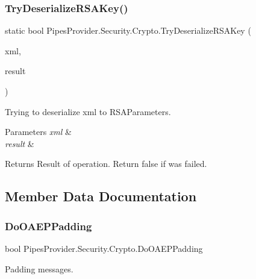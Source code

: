 \subsubsection{\texorpdfstring{Try\+Deserialize\+R\+S\+A\+Key()}{TryDeserializeRSAKey()}}
{\footnotesize\ttfamily static bool Pipes\+Provider.\+Security.\+Crypto.\+Try\+Deserialize\+R\+S\+A\+Key (\begin{DoxyParamCaption}\item[{string}]{xml,  }\item[{out R\+S\+A\+Parameters}]{result }\end{DoxyParamCaption})\hspace{0.3cm}{\ttfamily [static]}}



Trying to deserialize xml to R\+S\+A\+Parameters. 


\begin{DoxyParams}{Parameters}
{\em xml} & \\
\hline
{\em result} & \\
\hline
\end{DoxyParams}
\begin{DoxyReturn}{Returns}
Result of operation. Return false if was failed.
\end{DoxyReturn}


\subsection{Member Data Documentation}
\mbox{\label{class_pipes_provider_1_1_security_1_1_crypto_a47ca964d3fea31884d730936a9be1c81}} 
\subsubsection{\texorpdfstring{Do\+O\+A\+E\+P\+Padding}{DoOAEPPadding}}
{\footnotesize\ttfamily bool Pipes\+Provider.\+Security.\+Crypto.\+Do\+O\+A\+E\+P\+Padding\hspace{0.3cm}{\ttfamily [static]}}



Padding messages. 

\mbox{\label{class_pipes_provider_1_1_security_1_1_crypto_a891868b922c2ce6a0f85a01c6bf684e5}} 
